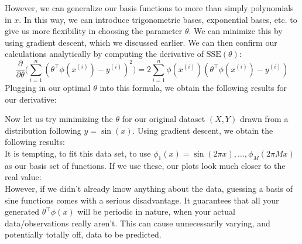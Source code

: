 \documentclass[11pt,letterpaper]{article}
\begin{document}
However, we can generalize our basis functions to more than simply polynomials in $x$. In this way, we can introduce trigonometric bases, exponential bases, etc. to give us more flexibility in choosing the parameter $\theta$. 
We can minimize this by using gradient descent, which we discussed earlier. We can then confirm our calculations analytically by computing the derivative of $\text{SSE}(\theta)$:
$$\frac{\partial}{\partial\theta}\Big(\sum_{i=1}^n (\theta^\intercal\phi(x^{(i)}) - y^{(i)})^2\Big) = 2\sum_{i=1}^n \phi(x^{(i)})(\theta^\intercal\phi(x^{(i)}) - y^{(i)})$$
Plugging in our optimal $\theta$ into this formula, we obtain the following results for our derivative:

Now let us try minimizing the $\theta$ for our original dataset $(X, Y)$ drawn from a distribution following $y = \sin(x)$. Using gradient descent, we obtain the following results:\\
It is tempting, to fit this data set, to use $\phi_1(x) = \sin(2\pi x), \ldots , \phi_M(2\pi Mx)$ as our basis set of functions. If we use these, our plots look much closer to the real value:\\
However, if we didn't already know anything about the data, guessing a basis of sine functions comes with a serious disadvantage. It guarantees that all your generated $\theta^\intercal\phi(x)$ will be periodic in nature, when your actual data/observations really aren't. This can cause unnecessarily varying, and potentially totally off, data to be predicted.\\
\end{document}
